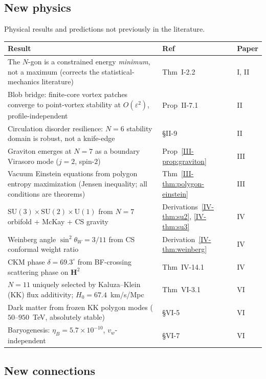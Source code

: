 \subsection{New physics}

Physical results and predictions not previously in the literature.

\medskip
\begin{tabular}{p{6.5cm}lp{4cm}}
\toprule
Result & Ref & Paper \\
\midrule
The $N$-gon is a constrained energy
  \emph{minimum}, not a maximum
  (corrects the statistical-mechanics literature) &
  Thm~I-2.2 & I, II \\[4pt]
Blob bridge: finite-core vortex patches
  converge to point-vortex stability at
  $O(\varepsilon^2)$, profile-independent &
  Prop~II-7.1 & II \\[4pt]
Circulation disorder resilience:
  $N = 6$ stability domain is robust,
  not a knife-edge &
  \S II-9 & II \\[4pt]
Graviton emerges at $N = 7$ as a boundary
  Virasoro mode ($j = 2$, spin-$2$) &
  Prop~\ref*{III-prop:graviton} & III \\[4pt]
Vacuum Einstein equations from polygon
  entropy maximization (Jensen inequality;
  all conditions are theorems) &
  Thm~\ref*{III-thm:polygon-einstein} & III \\[4pt]
$\mathrm{SU}(3) \times \mathrm{SU}(2) \times
  \mathrm{U}(1)$ from $N = 7$ orbifold +
  McKay + CS gravity &
  Derivations~\ref*{IV-thm:su2}, \ref*{IV-thm:su3} & IV \\[4pt]
Weinberg angle $\sin^2\theta_W = 3/11$
  from CS conformal weight ratio &
  Derivation~\ref*{IV-thm:weinberg} & IV \\[4pt]
CKM phase $\delta = 69.3^\circ$ from
  BF-crossing scattering phase on
  $\mathbf{H}^2$ &
  Thm~IV-14.1 & IV \\[4pt]
$N = 11$ uniquely selected by Kaluza--Klein (KK) flux
  additivity; $H_0 = 67.4$~km/s/Mpc &
  Thm~VI-3.1 & VI \\[4pt]
Dark matter from frozen KK polygon modes
  ($50$--$950$~TeV, absolutely stable) &
  \S VI-5 & VI \\[4pt]
Baryogenesis: $\eta_B = 5.7 \times 10^{-10}$,
  $v_w$-independent &
  \S VI-7 & VI \\[4pt]
\bottomrule
\end{tabular}

\subsection{New connections}

